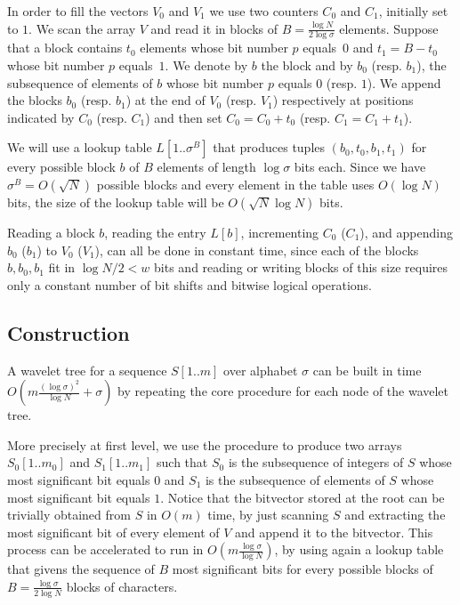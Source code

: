 \documentclass[11pt,runningheads]{llncs}
\begin{document}
In order to fill the vectors $V_0$
and $V_1$ we use two counters $C_0$ and $C_1$,
initially set to $1$. 
We scan the array $V$ and read it in 
blocks of $B=\frac{\log N}{2\log\sigma}$ elements. Suppose that 
a block contains $t_0$ elements whose bit number $p$ equals~$0$
and $t_1=B-t_0$ whose bit number $p$ equals~$1$. 
We denote by $b$ the block and by $b_0$ (resp. $b_1$), 
the subsequence of elements of $b$ whose bit number $p$ equals 
$0$ (resp. $1$). We append the blocks $b_0$ (resp. $b_1$) 
at the end of $V_0$ (resp. $V_1$) respectively at positions 
indicated by $C_0$ (resp. $C_1$) and then set $C_0=C_0+t_0$
(resp. $C_1=C_1+t_1$). 

We will use a lookup table $L[1..\sigma^B]$ that produces tuples 
$(b_0,t_0,b_1,t_1)$ for every possible 
block $b$ of $B$ elements of length $\log\sigma$ bits each. 
Since we have 
$\sigma^B=O(\sqrt{N})$ possible blocks and every 
element in the table uses $O(\log N)$ bits, the size of the lookup table will 
be $O(\sqrt{N}\log N)$ bits. 

Reading a block $b$, reading the entry $L[b]$, incrementing $C_0$ ($C_1$), and appending $b_0$ ($b_1$) 
to $V_0$ ($V_1$), can all be done in constant time, since each of
the blocks $b,b_0,b_1$ fit in $\log N/2<w$ bits and reading or writing 
blocks of this size requires only a constant number of bit shifts and bitwise logical operations. 

\subsection{Construction}
A wavelet tree for a sequence $S[1..m]$ over alphabet $\sigma$ can be built 
in time $O(m\frac{(\log\sigma)^2}{\log N}+\sigma)$ by repeating the 
core procedure for each node of the wavelet tree. 

More precisely at first level, 
we use the procedure to produce two arrays $S_0[1..m_0]$ and $S_1[1..m_1]$ 
such that $S_0$ is the subsequence of integers of $S$ whose 
most significant bit equals $0$ and $S_1$ is the subsequence of elements of $S$ whose 
most significant bit equals $1$. Notice that the bitvector stored at the root 
can be trivially obtained from $S$ in $O(m)$ time, by just scanning $S$ and 
extracting the most significant 
bit of every element of $V$ and append it to the bitvector. This process can be accelerated 
to run in $O(m\frac{\log\sigma}{\log N})$, by using again a lookup table that givens the 
sequence of $B$ most significant bits for every possible blocks of $B=\frac{\log\sigma}{2\log N}$
blocks of characters. 
\end{document}
